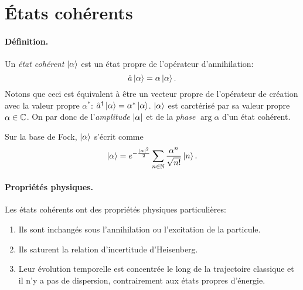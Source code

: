 \documentclass[11pt,a4paper,oneside]{article}
\begin{document}
\section{États cohérents}

\paragraph*{Définition.} Un \emph{état cohérent} $\ket{\alpha}$ est un état propre de l'opérateur d'annihilation:
\begin{equation*}
    \hat{a}\ket{\alpha}=\alpha\ket{\alpha}.
\end{equation*}
Notons que ceci est équivalent à être un vecteur propre de l'opérateur de création avec la valeur propre $\alpha^*$: $\hat{a}^\dagger\ket{\alpha}=\alpha^*\ket{\alpha}$. $\ket{\alpha}$ est carctérisé par sa valeur propre $\alpha\in\mathbb{C}$. On par donc de l'\emph{amplitude} $\abs{\alpha}$ et de la \emph{phase} $\arg{\alpha}$ d'un état cohérent.

Sur la base de Fock, $\ket{\alpha}$ s'écrit comme
\begin{equation*}
    \ket{\alpha} = e^{-\frac{\abs{\alpha}^2}{2}}\sum_{n\in\mathbb{N}}\frac{\alpha^n}{\sqrt{n!}}\ket{n}.
\end{equation*}

\paragraph*{Propriétés physiques.} Les états cohérents ont des propriétés physiques particulières:
\begin{enumerate}[label=\roman*)]
    \item Ils sont inchangés sous l'annihilation ou l'excitation de la particule.
    \item Ils saturent la relation d'incertitude d'Heisenberg.
    \item Leur évolution temporelle est concentrée le long de la trajectoire classique et il n'y a pas de dispersion, contrairement aux états propres d'énergie.
\end{enumerate}
\end{document}
